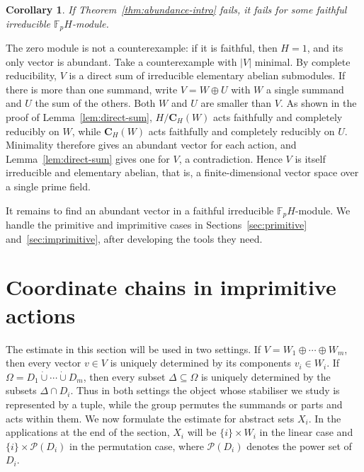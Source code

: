 \documentclass[10pt]{amsart}
\newtheorem{corollary}[theorem]{Corollary}
\theoremstyle{definition}
\let\oldendproof\endproof
\renewenvironment{proof}[1][\proofname]{%
  \oldproof[\bfseries #1]%
}{\oldendproof}
\newcommand{\pow}{\mathcal{P}}
\numberwithin{equation}{section}
\numberwithin{table}{section}
\begin{document}
\begin{corollary}\label{cor:reduce-irreducible}
If Theorem~\ref{thm:abundance-intro} fails, it fails for some faithful
irreducible $\mathbb{F}_pH$-module.
\end{corollary}

\begin{proof}
The zero module is not a counterexample: if it is faithful, then $H=1$, and
its only vector is abundant. Take a counterexample with $|V|$ minimal. By
complete reducibility, $V$ is a direct sum
of irreducible elementary abelian submodules. If there is more than one summand,
write $V=W\oplus U$ with $W$ a single summand and $U$ the sum of the others.
Both $W$ and $U$ are smaller than $V$. As shown in the proof of
Lemma~\ref{lem:direct-sum}, $H/\mathbf{C}_H(W)$ acts faithfully and completely
reducibly on $W$, while $\mathbf{C}_H(W)$ acts faithfully and completely
reducibly on $U$. Minimality therefore gives an abundant vector for each
action, and Lemma~\ref{lem:direct-sum} gives one for $V$, a contradiction.
Hence $V$ is itself irreducible and elementary abelian, that is, a
finite-dimensional vector space over a single prime field.
\end{proof}

It remains to find an abundant vector in a faithful
irreducible $\mathbb{F}_pH$-module. We handle the primitive and imprimitive cases in
Sections~\ref{sec:primitive} and~\ref{sec:imprimitive}, after developing the
tools they need.

\section{Coordinate chains in imprimitive actions}
\label{sec:coordinate}

The estimate in this section will be used in two settings. If
$V=W_1\oplus\cdots\oplus W_m$, then every vector $v\in V$ is uniquely
determined by its components $v_i\in W_i$. If
$\Omega=D_1\mathbin{\dot\cup}\cdots\mathbin{\dot\cup}D_m$, then every subset
$\Delta\subseteq\Omega$ is uniquely determined by the subsets
$\Delta\cap D_i$. Thus in both settings the object whose stabiliser we study
is represented by a tuple, while the group permutes the summands or parts and
acts within them. We now formulate the estimate for abstract sets $X_i$. In
the applications at the end of the section, $X_i$ will be $\{i\}\times W_i$
in the linear case and $\{i\}\times\pow(D_i)$ in the permutation case, where
$\pow(D_i)$ denotes the power set of $D_i$.
\end{document}
